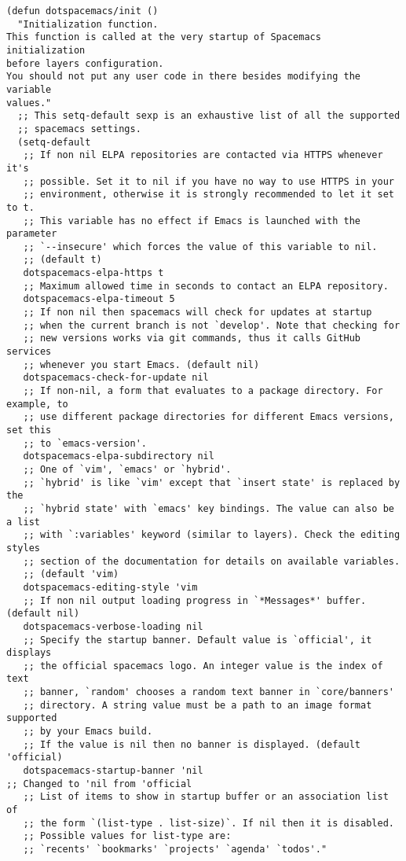 \documentclass[11pt]{article}
\begin{document}
\begin{verbatim}
(defun dotspacemacs/init ()
  "Initialization function.
This function is called at the very startup of Spacemacs initialization
before layers configuration.
You should not put any user code in there besides modifying the variable
values."
  ;; This setq-default sexp is an exhaustive list of all the supported
  ;; spacemacs settings.
  (setq-default
   ;; If non nil ELPA repositories are contacted via HTTPS whenever it's
   ;; possible. Set it to nil if you have no way to use HTTPS in your
   ;; environment, otherwise it is strongly recommended to let it set to t.
   ;; This variable has no effect if Emacs is launched with the parameter
   ;; `--insecure' which forces the value of this variable to nil.
   ;; (default t)
   dotspacemacs-elpa-https t
   ;; Maximum allowed time in seconds to contact an ELPA repository.
   dotspacemacs-elpa-timeout 5
   ;; If non nil then spacemacs will check for updates at startup
   ;; when the current branch is not `develop'. Note that checking for
   ;; new versions works via git commands, thus it calls GitHub services
   ;; whenever you start Emacs. (default nil)
   dotspacemacs-check-for-update nil
   ;; If non-nil, a form that evaluates to a package directory. For example, to
   ;; use different package directories for different Emacs versions, set this
   ;; to `emacs-version'.
   dotspacemacs-elpa-subdirectory nil
   ;; One of `vim', `emacs' or `hybrid'.
   ;; `hybrid' is like `vim' except that `insert state' is replaced by the
   ;; `hybrid state' with `emacs' key bindings. The value can also be a list
   ;; with `:variables' keyword (similar to layers). Check the editing styles
   ;; section of the documentation for details on available variables.
   ;; (default 'vim)
   dotspacemacs-editing-style 'vim
   ;; If non nil output loading progress in `*Messages*' buffer. (default nil)
   dotspacemacs-verbose-loading nil
   ;; Specify the startup banner. Default value is `official', it displays
   ;; the official spacemacs logo. An integer value is the index of text
   ;; banner, `random' chooses a random text banner in `core/banners'
   ;; directory. A string value must be a path to an image format supported
   ;; by your Emacs build.
   ;; If the value is nil then no banner is displayed. (default 'official)
   dotspacemacs-startup-banner 'nil                                                              ;; Changed to 'nil from 'official
   ;; List of items to show in startup buffer or an association list of
   ;; the form `(list-type . list-size)`. If nil then it is disabled.
   ;; Possible values for list-type are:
   ;; `recents' `bookmarks' `projects' `agenda' `todos'."

\end{verbatim}
\end{document}
